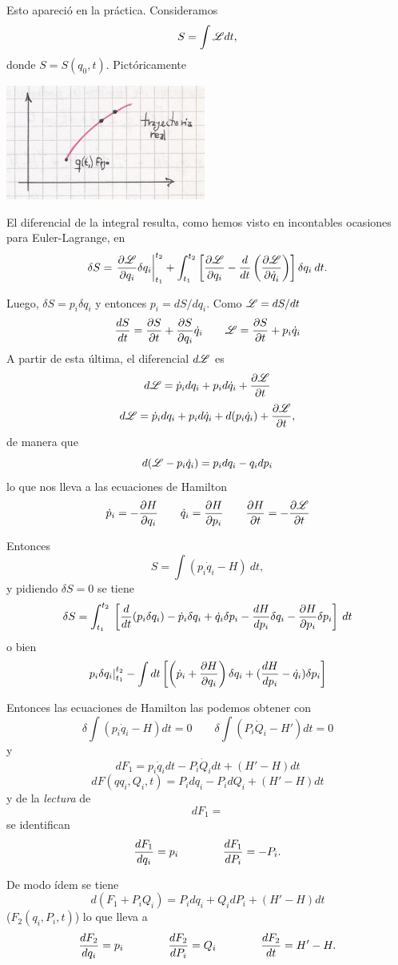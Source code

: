 \documentclass[10pt,oneside]{CBFT_book}
\begin{document}
Esto apareció en la práctica. Consideramos
\[
	S = \int \Lag dt,
\]
donde $S = S(q_0,t)$. Pictóricamente

\includegraphics[scale=0.5]{images/fig_mc_ham-jac_1.jpg}

El diferencial de la integral resulta, como hemos visto en incontables ocasiones para Euler-Lagrange, en
\[
	\delta S = \left. \dpar{ \Lag }{ q_i } \delta q_i \right|_{t_1}^{t_2} + 
	\int_{t_1}^{t_2} \left[ \dpar{ \Lag }{ q_i } - \dtot{}{t}\Dpar{\Lag}{\dot{q}_i} \right] \delta q_i \: dt. 
\]

Luego, $ \delta S = p_i \delta q_i  $ y entonces $ p_i = dS / dq_i $. Como $\Lag = dS / dt $
\[
	\dtot{S}{t} = \dpar{S}{t} + \dpar{S}{q_i} \dot{q}_i \qquad \Lag = \dpar{S}{t} + p_i \dot{q}_i
\]
A partir de esta última, el diferencial $d\Lag$ es
\[
	d\Lag = \dot{p}_i dq_i + p_i d\dot{q}_i + \dpar{\Lag}{t}
\]
\[
	d\Lag = \dot{p}_i dq_i + p_i d\dot{q}_i + d( p_i \dot{q}_i ) + \dpar{\Lag}{t},
\]
de manera que 
\[
	d( \Lag - p_i \dot{q}_i ) = p_i dq_i - q_i dp_i
\]
lo que nos lleva a las ecuaciones de Hamilton
\[
	\dot{p}_i = - \dpar{H}{q_i} \qquad \dot{q}_i = \dpar{H}{p_i} \qquad \dpar{H}{t} = - \dpar{\Lag}{t} 
\]

Entonces
\[
	S = \int ( p_i \dot{q}_i - H ) \: dt,
\]
y pidiendo $\delta S=0$ se tiene 
\[
	\delta S = \int_{t_1}^{t_2}  \: \left[ \dtot{}{t}( p_i \delta q_i ) - \dot{p}_i \delta q_i + \dot{q}_i \delta p_i 
	- \dtot{H}{p_i} \delta q_i - \dpar{H}{p_i} \delta p_i \right] \: dt
\]
o bien 
\[
	\left. p_i \delta q_i \right|_{t_1}^{t_2} - \int dt 
	\left[ \left( \dot{p}_i + \dpar{H}{q_i} \right) \delta q_i + ( \dtot{H}{p_i} - \dot{q}_i ) \delta p_i \right]
\]

Entonces las ecuaciones de Hamilton las podemos obtener con 
\[
	\delta \int ( p_i \dot{q}_i - H ) dt = 0 \qquad \delta \int ( P_i \dot{Q}_i - H' ) dt = 0
\]
y
\[
	dF_1 = p_i \dot{q}_i dt - P_i \dot{Q}_i dt + (H'-H)dt
\]
\[
	dF( qq_i, Q_i, t ) = P_i dq_i - P_i dQ_i + (H'- H)dt
\]
y de la {\it lectura} de 
\[
	dF_1 =
\]
se identifican 
\[
	\dtot{F_1}{q_i} = p_i \qquad \qquad \dtot{F_1}{P_i} = -P_i.
\]

De modo ídem se tiene 
\[
	d(F_1 + P_iQ_i) = P_i dq_i + Q_i dP_i + (H'-H)dt
\]
($F_2(q_i,P_i,t)$) lo que lleva a 
\[
	\dtot{F_2}{q_i} = p_i \qquad \qquad \dtot{F_2}{P_i} = Q_i \qquad \qquad \dtot{F_2}{t} = H'- H.
\]
\end{document}
